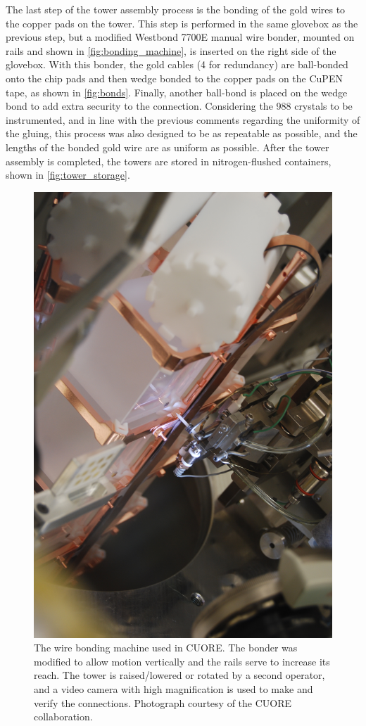 The last step of the tower assembly process is the bonding of the gold wires to the copper pads on the tower.
This step is performed in the same glovebox as the previous step, but a modified Westbond 7700E manual wire bonder, mounted on rails and shown in \autoref{fig:bonding_machine}, is inserted on the right side of the glovebox.
With this bonder, the gold cables (4 for redundancy) are ball-bonded onto the chip pads and then wedge bonded to the copper pads on the CuPEN tape, as shown in \autoref{fig:bonds}.
Finally, another ball-bond is placed on the wedge bond to add extra security to the connection.
Considering the 988 crystals to be instrumented, and in line with the previous comments regarding the uniformity of the gluing, this process was also designed to be as repeatable as possible, and the lengths of the bonded gold wire are as uniform as possible.
After the tower assembly is completed, the towers are stored in nitrogen-flushed containers, shown in \autoref{fig:tower_storage}.

\begin{figure}[htbp]
    \centering
    \includegraphics[width=0.6\linewidth, angle=270, origin=c]{Figures/bonding_machine.jpg}
    \caption[The wire bonding machine used in CUORE.]
    {The wire bonding machine used in CUORE.
    The bonder was modified to allow motion vertically and the rails serve to increase its reach.
    The tower is raised/lowered or rotated by a second operator, and a video camera with high magnification is used to make and verify the connections.
    Photograph courtesy of the CUORE collaboration.}
    \label{fig:bonding_machine}
\end{figure}

